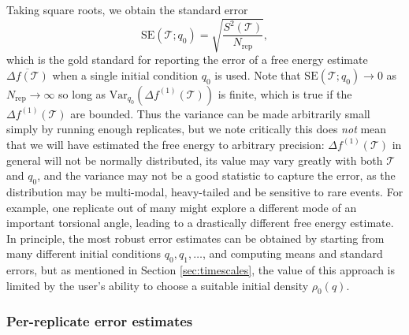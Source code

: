 Taking square roots, we obtain the standard error
\begin{equation}
  \mathrm{SE} (\mathcal{T} ; q_0) = \sqrt{\frac{S^2(\mathcal{T})}{N_{\mathrm{rep}}}},
\end{equation}
which is the gold standard for reporting the error of a free energy estimate $\overline{\Delta f (\mathcal{T})} $ when a single initial condition $q_0$ is used. Note that $\mathrm{SE}
(\mathcal{T} ; q_0) \rightarrow 0$ as $N_{\mathrm{rep}} \rightarrow \infty$ so long as $\mathrm{Var}_{q_0}(\Delta f^{(1)}(\mathcal{T}))$ is finite, which is true if the $\Delta f^{(1)}(\mathcal{T})$ are bounded. Thus the variance can be made arbitrarily small simply by running enough replicates, but we note critically this does \textit{not} mean that we will have estimated the free energy to arbitrary precision: $\Delta f^{(1)}(\mathcal{T})$ in general will not be normally distributed, its value may vary greatly with both $\mathcal{T}$ and $q_0$, and the variance may not be a good statistic to capture the error, as the distribution may be multi-modal, heavy-tailed and be sensitive to rare events. For example, one replicate out of many might explore a different mode of an important torsional angle, leading to a drastically different free energy estimate. 
In principle, the most robust error estimates can be obtained by starting from many different initial conditions $q_0, q_1, \dots$, and computing means and standard errors, but as mentioned in Section \ref{sec:timescales}, the value of this approach is limited by the user's ability to choose a suitable initial density $\rho_0(q)$.

\subsubsection{Per-replicate error estimates}

